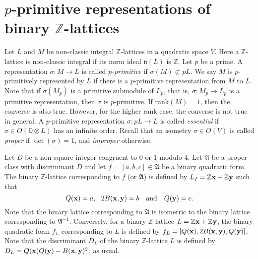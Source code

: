 \documentclass{amsart}
\theoremstyle{definition}
\theoremstyle{remark}
\numberwithin{equation}{section}
\begin{document}
\section{$p$-primitive representations of binary ${{\mathbb Z}}$-lattices}

Let $L$ and $M$ be non-classic integral ${{\mathbb Z}}$-lattices in a quadratic space $V$. Here a ${{\mathbb Z}}$-lattice is non-classic integral if its norm 
ideal $\mathfrak n(L)$ is ${{\mathbb Z}}$. Let $p$ be a prime.  A representation $\sigma : M \to L$ is called {\it  $p$-primitive}  if $\sigma(M) \not \subset pL$.  We say $M$ is $p$-primitively represented by $L$ if there is a $p$-primitive representation from $M$ to $L$. Note that if $\sigma(M_p)$ is a primitive submodule of $L_p$, that is, $\sigma : M_p \to L_p$ is a primitive representation, then $\sigma$ is $p$-primitive. If ${\text{rank}}(M)=1$, then the converse is also true. However, for the higher rank case, the converse is not true in general.  A $p$-primitive representation $\sigma : pL \to L$ is called {\it essential} if $\sigma \in O({{\mathbb Q}}\otimes L)$ has an infinite order.  Recall that an isometry $\sigma \in O(V)$ is called {\it proper} if $\det(\sigma)=1$, and {\it improper} otherwise. 

Let $D$ be a non-square integer congruent to $0$ or $1$ modulo $4$. 
Let $\mathfrak A$ be a proper class with discriminant $D$ and let $f=[a,b,c] \in \mathfrak A$ be a binary quadratic form.  
The binary ${{\mathbb Z}}$-lattice  corresponding to $f$ (or $\mathfrak A$) is defined by $L_f={{\mathbb Z}} \bold x+{{\mathbb Z}} \bold y$  such that 
$$
Q(\bold x)=a, \  \ 2B(\bold x,\bold y)=b \quad \text{and}  \quad Q(\bold y)=c.
$$   
Note that the binary lattice corresponding to $\mathfrak A$ is isometric to the binary lattice corresponding to $\mathfrak A^{-1}$.      
Conversely, for a binary ${{\mathbb Z}}$-lattice $L={{\mathbb Z}} \bold x+{{\mathbb Z}} \bold y$, the binary quadratic form $f_L$ corresponding to $L$ is defined by $f_L=[Q(\bold x),2B(\bold x,\bold y),Q(\bold y)]$. 
Note that the discriminant $D_L$ of the binary ${{\mathbb Z}}$-lattice $L$ is defined by $D_L=Q(\bold x)Q(\bold y)-B(\bold x,\bold y)^2$, as usual.  
\end{document}
